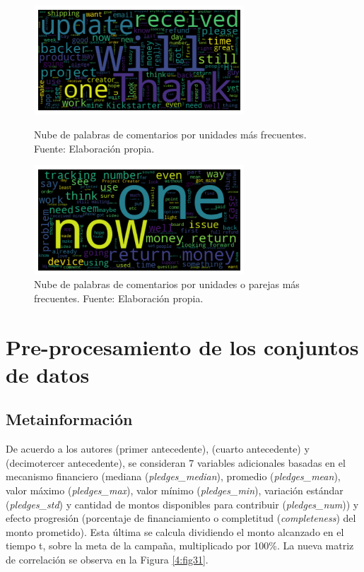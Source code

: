 \begin{figure}[htbp]
	\begin{center}
		\includegraphics[width=0.70\textwidth]{4/figures/comments_wordcloud_wordunit.png}
		\caption{Nube de palabras de comentarios por unidades más frecuentes. Fuente: Elaboración propia.}
		\label{4:fig29}
		
		\includegraphics[width=0.70\textwidth]{4/figures/comments_wordcloud_wordcouple.png}
		\caption{Nube de palabras de comentarios por unidades o parejas más frecuentes. Fuente: Elaboración propia.}
		\label{4:fig30}
	\end{center}
\end{figure}

\section{Pre-procesamiento de los conjuntos de datos}

\subsection{Metainformación}
De acuerdo a los autores \citeauthor{pr_chen2013kickpredict} (primer antecedente), \citeauthor{pr_chen2015predcrowd} (cuarto antecedente) y \citeauthor{pr_jin2019dayssuccess} (decimotercer antecedente), se consideran 7 variables adicionales basadas en el mecanismo financiero (mediana (\textit{pledges\_median}), promedio (\textit{pledges\_mean}), valor máximo (\textit{pledges\_max}), valor mínimo (\textit{pledges\_min}), variación estándar (\textit{pledges\_std}) y cantidad de montos disponibles para contribuir (\textit{pledges\_num})) y efecto progresión (porcentaje de financiamiento o completitud (\textit{completeness}) del monto prometido). Esta última se calcula dividiendo el monto alcanzado en el tiempo t, sobre la meta de la campaña, multiplicado por 100\%. La nueva matriz de correlación se observa en la Figura \ref{4:fig31}.

